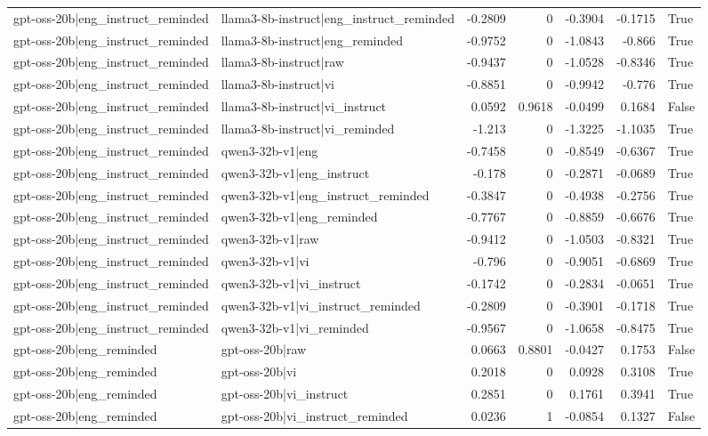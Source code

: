\begin{table}
\begin{tabular}{l l r r r r l}
gpt-oss-20b|eng_instruct_reminded & llama3-8b-instruct|eng_instruct_reminded & -0.2809 & 0 & -0.3904 & -0.1715 & True \\
gpt-oss-20b|eng_instruct_reminded & llama3-8b-instruct|eng_reminded & -0.9752 & 0 & -1.0843 & -0.866 & True \\
gpt-oss-20b|eng_instruct_reminded & llama3-8b-instruct|raw & -0.9437 & 0 & -1.0528 & -0.8346 & True \\
gpt-oss-20b|eng_instruct_reminded & llama3-8b-instruct|vi & -0.8851 & 0 & -0.9942 & -0.776 & True \\
gpt-oss-20b|eng_instruct_reminded & llama3-8b-instruct|vi_instruct & 0.0592 & 0.9618 & -0.0499 & 0.1684 & False \\
gpt-oss-20b|eng_instruct_reminded & llama3-8b-instruct|vi_reminded & -1.213 & 0 & -1.3225 & -1.1035 & True \\
gpt-oss-20b|eng_instruct_reminded & qwen3-32b-v1|eng & -0.7458 & 0 & -0.8549 & -0.6367 & True \\
gpt-oss-20b|eng_instruct_reminded & qwen3-32b-v1|eng_instruct & -0.178 & 0 & -0.2871 & -0.0689 & True \\
gpt-oss-20b|eng_instruct_reminded & qwen3-32b-v1|eng_instruct_reminded & -0.3847 & 0 & -0.4938 & -0.2756 & True \\
gpt-oss-20b|eng_instruct_reminded & qwen3-32b-v1|eng_reminded & -0.7767 & 0 & -0.8859 & -0.6676 & True \\
gpt-oss-20b|eng_instruct_reminded & qwen3-32b-v1|raw & -0.9412 & 0 & -1.0503 & -0.8321 & True \\
gpt-oss-20b|eng_instruct_reminded & qwen3-32b-v1|vi & -0.796 & 0 & -0.9051 & -0.6869 & True \\
gpt-oss-20b|eng_instruct_reminded & qwen3-32b-v1|vi_instruct & -0.1742 & 0 & -0.2834 & -0.0651 & True \\
gpt-oss-20b|eng_instruct_reminded & qwen3-32b-v1|vi_instruct_reminded & -0.2809 & 0 & -0.3901 & -0.1718 & True \\
gpt-oss-20b|eng_instruct_reminded & qwen3-32b-v1|vi_reminded & -0.9567 & 0 & -1.0658 & -0.8475 & True \\
gpt-oss-20b|eng_reminded & gpt-oss-20b|raw & 0.0663 & 0.8801 & -0.0427 & 0.1753 & False \\
gpt-oss-20b|eng_reminded & gpt-oss-20b|vi & 0.2018 & 0 & 0.0928 & 0.3108 & True \\
gpt-oss-20b|eng_reminded & gpt-oss-20b|vi_instruct & 0.2851 & 0 & 0.1761 & 0.3941 & True \\
gpt-oss-20b|eng_reminded & gpt-oss-20b|vi_instruct_reminded & 0.0236 & 1 & -0.0854 & 0.1327 & False \\

\end{tabular}
\end{table}
